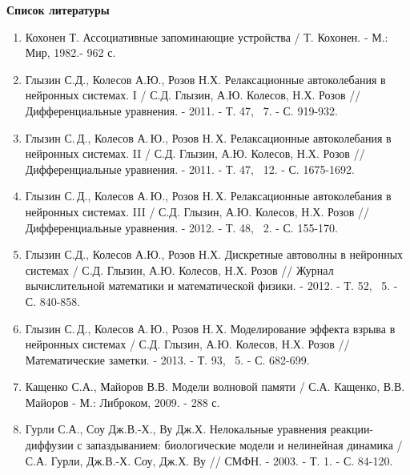 \documentclass[12pt]{extarticle}
\begin{document}
\newpage

\begin{center}
{\Large \textbf{Список литературы}}
\end{center}

\hspace{0cm}

\hspace{0cm}

\hspace{0cm}

\begin{enumerate}[leftmargin=1.5\parindent]

\item Кохонен Т. Ассоциативные запоминающие устройства / Т. Кохонен. - М.: Мир, 1982.- 962 с.

\item Глызин С.Д., Колесов А.Ю., Розов Н.Х. Релаксационные автоколебания в нейронных системах. I / С.Д. Глызин, А.Ю. Колесов, Н.Х. Розов // Дифференциальные уравнения. - 2011. - Т. 47, \textnumero~7. - С. 919-932.

\item Глызин С.\,Д., Колесов А.\,Ю., Розов Н.\,Х. Релаксационные автоколебания в нейронных системах. II / С.Д. Глызин, А.Ю. Колесов, Н.Х. Розов  // Дифференциальные уравнения. - 2011. - Т. 47, \textnumero~12. - С. 1675-1692.

\item Глызин С.\,Д., Колесов А.\,Ю., Розов Н.\,Х. Релаксационные автоколебания в нейронных системах. III / С.Д. Глызин, А.Ю. Колесов, Н.Х. Розов  // Дифференциальные уравнения. - 2012. - Т. 48, \textnumero~2. - С. 155-170.

\item Глызин С.Д., Колесов А.Ю., Розов Н.Х. Дискретные автоволны в нейронных системах / С.Д. Глызин, А.Ю. Колесов, Н.Х. Розов  // Журнал вычислительной математики и математической физики. - 2012. - Т. 52, \textnumero~5. - С. 840-858. 

\item Глызин С.\,Д., Колесов А.\,Ю., Розов Н.\,Х. Моделирование эффекта взрыва в нейронных системах / С.Д. Глызин, А.Ю. Колесов, Н.Х. Розов  // Математические заметки. - 2013. - Т. 93, \textnumero~5. - С. 682-699.

\item Кащенко С.А., Майоров В.В. Модели волновой памяти / С.А. Кащенко, В.В. Майоров - М.: Либроком, 2009. - 288 с.

\item Гурли С.А., Соу Дж.В.-Х., Ву Дж.Х. Нелокальные уравнения реакции-диффузии с запаздыванием: биологические модели и нелинейная динамика / С.А. Гурли, Дж.В.-Х. Соу, Дж.Х. Ву // СМФН. - 2003. - Т. 1. - С. 84-120.


\end{enumerate}
\end{document}

